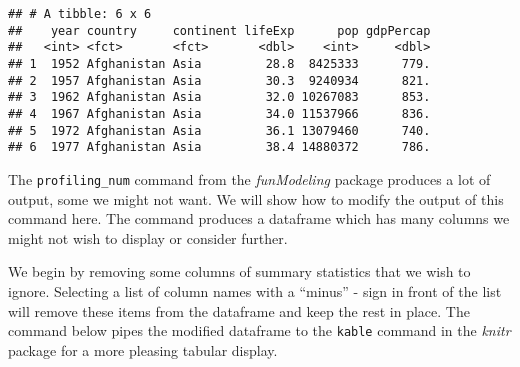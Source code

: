 \documentclass[
]{book}
\newenvironment{Shaded}{\begin{snugshade}}{\end{snugshade}}
\newcommand{\CommentTok}[1]{\textcolor[rgb]{0.56,0.35,0.01}{\textit{#1}}}
\newcommand{\KeywordTok}[1]{\textcolor[rgb]{0.13,0.29,0.53}{\textbf{#1}}}
\newcommand{\NormalTok}[1]{#1}
\newcommand{\OperatorTok}[1]{\textcolor[rgb]{0.81,0.36,0.00}{\textbf{#1}}}
\newcommand{\StringTok}[1]{\textcolor[rgb]{0.31,0.60,0.02}{#1}}
\begin{document}
\begin{Shaded}
\end{Shaded}

\begin{verbatim}
## # A tibble: 6 x 6
##    year country     continent lifeExp      pop gdpPercap
##   <int> <fct>       <fct>       <dbl>    <int>     <dbl>
## 1  1952 Afghanistan Asia         28.8  8425333      779.
## 2  1957 Afghanistan Asia         30.3  9240934      821.
## 3  1962 Afghanistan Asia         32.0 10267083      853.
## 4  1967 Afghanistan Asia         34.0 11537966      836.
## 5  1972 Afghanistan Asia         36.1 13079460      740.
## 6  1977 Afghanistan Asia         38.4 14880372      786.
\end{verbatim}

The \texttt{profiling\_num} command from the \emph{funModeling} package produces a lot of output, some we might not want. We will
show how to modify the output of this command here. The command produces a dataframe which has many columns we might not wish to display or consider further.

We begin by removing some columns of summary statistics that we wish to ignore. Selecting a list of column names with a ``minus'' - sign in front of the list will remove these items from the dataframe and keep the rest in place. The command below pipes the modified dataframe to the \texttt{kable} command in the \emph{knitr} package for a more pleasing tabular display.

\begin{Shaded}
\end{Shaded}
\end{document}
